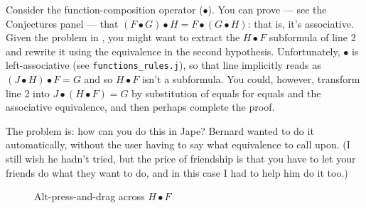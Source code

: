 Consider the function-composition operator ($\bullet$). You can prove --- see the Conjectures panel --- that $(F\bullet G)\bullet H = F\bullet(G\bullet H)$: that is, it's associative. Given the problem in , you might want to extract the $H \bullet F$ subformula of line 2 and rewrite it using the equivalence in the second hypothesis. Unfortunately, $\bullet$ is left-associative (see \texttt{functions\_rules.j}), so that line implicitly reads as $(J\bullet H)\bullet F = G$ and so $H \bullet F$ isn't a subformula. You could, however, transform line 2 into $J\bullet (H \bullet F) = G$ by substitution of equals for equals and the associative equivalence, and then perhaps complete the proof.

The problem is: how can you do this in Jape? Bernard wanted to do it automatically, without the user having to say what equivalence to call upon. (I still wish he hadn't tried, but the price of friendship is that you have to let your friends do what they want to do, and in this case I had to help him do it too.)

\begin{figure}
\centering
{}
\qquad
{}
\caption{Alt-press-and-drag across $H \bullet F$}
\label{fig:funcprog:textselectionillustrated}
\end{figure}

